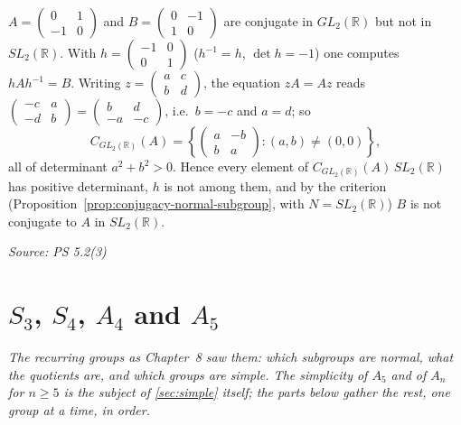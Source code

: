 \documentclass[11pt]{report}
\newcommand{\srcline}[1]{\par\hfill{\footnotesize\textit{Source: #1}}}
\begin{document}
\begin{exbox}\label{ex:rotations-90}
$A = \begin{pmatrix} 0 & 1 \\ -1 & 0 \end{pmatrix}$ and $B = \begin{pmatrix} 0 & -1 \\ 1 & 0 \end{pmatrix}$ are conjugate in $GL_2(\mathbb{R})$ but not in $SL_2(\mathbb{R})$. With $h = \begin{pmatrix} -1 & 0 \\ 0 & 1 \end{pmatrix}$ ($h^{-1} = h$, $\det h = -1$) one computes $hAh^{-1} = B$. Writing $z = \begin{pmatrix} a & c \\ b & d \end{pmatrix}$, the equation $zA = Az$ reads $\begin{pmatrix} -c & a \\ -d & b \end{pmatrix} = \begin{pmatrix} b & d \\ -a & -c \end{pmatrix}$, i.e.\ $b = -c$ and $a = d$; so
\[ C_{GL_2(\mathbb{R})}(A) = \left\{ \begin{pmatrix} a & -b \\ b & a \end{pmatrix} : (a, b) \neq (0, 0) \right\}, \]
all of determinant $a^2 + b^2 > 0$. Hence every element of $C_{GL_2(\mathbb{R})}(A)\,SL_2(\mathbb{R})$ has positive determinant, $h$ is not among them, and by the criterion (Proposition~\ref{prop:conjugacy-normal-subgroup}, with $N = SL_2(\mathbb{R})$) $B$ is not conjugate to $A$ in $SL_2(\mathbb{R})$.
\srcline{PS 5.2(3)}
\end{exbox}



\section{\texorpdfstring{$S_3$, $S_4$, $A_4$ and $A_5$}{S₃, S₄, A₄ and A₅}}\label{sec:rev-ch8}

\textit{The recurring groups as Chapter~8 saw them: which subgroups are normal, what the quotients are, and which groups are simple. The simplicity of $A_5$ and of $A_n$ for $n \geq 5$ is the subject of \ref{sec:simple} itself; the parts below gather the rest, one group at a time, in order.}
\end{document}

